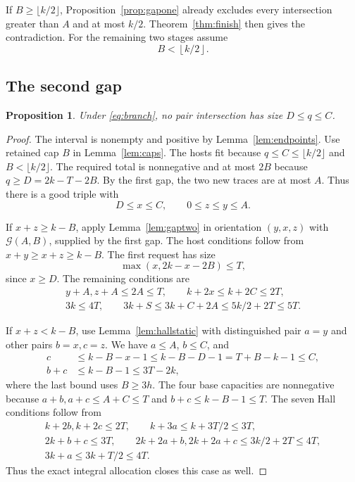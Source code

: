 \documentclass[11pt]{article}
\numberwithin{equation}{section}
\newtheorem{proposition}[theorem]{Proposition}
\theoremstyle{definition}
\theoremstyle{remark}
\newcommand{\floor}[1]{\left\lfloor #1\right\rfloor}
\begin{document}
If $B\ge\lfloor k/2\rfloor$, Proposition~\ref{prop:gapone} already
excludes every intersection greater than $A$ and at most $k/2$.
Theorem~\ref{thm:finish} then gives the contradiction.
For the remaining two stages assume
\begin{equation}\label{eq:branch}
 B<\floor{k/2}.
\end{equation}

\subsection{The second gap}
\begin{proposition}\label{prop:gaptwo}
Under \eqref{eq:branch}, no pair intersection has size $D\le q\le C$.
\end{proposition}
\begin{proof}
The interval is nonempty and positive by Lemma~\ref{lem:endpoints}.
Use retained cap $B$ in Lemma~\ref{lem:caps}.
The hosts fit because $q\le C\le\lfloor k/2\rfloor$ and
$B<\lfloor k/2\rfloor$. The required total is nonnegative and at most
$2B$ because $q\ge D=2k-T-2B$.
By the first gap, the two new traces are at most $A$.
Thus there is a good triple with
\[
 D\le x\le C,\qquad0\le z\le y\le A.
\]

If $x+z\ge k-B$, apply Lemma~\ref{lem:gaptwo} in orientation $(y,x,z)$
with $\mathcal G(A,B)$, supplied by the first gap.
The host conditions follow from $x+y\ge x+z\ge k-B$.
The first request has size
\[
 \max(x,2k-x-2B)\le T,
\]
since $x\ge D$. The remaining conditions are
\begin{gather*}
 y+A, z+A\le2A\le T,\qquad k+2x\le k+2C\le2T,\\
 3k\le4T,\qquad3k+S\le3k+C+2A\le5k/2+2T\le5T.
\end{gather*}

If $x+z<k-B$, use Lemma~\ref{lem:hallstatic} with distinguished pair
$a=y$ and other pairs $b=x,c=z$. We have $a\le A$, $b\le C$, and
\begin{align*}
 c&\le k-B-x-1\le k-B-D-1=T+B-k-1\le C,\\
 b+c&\le k-B-1\le3T-2k,
\end{align*}
where the last bound uses $B\ge3h$.
The four base capacities are nonnegative because
$a+b,a+c\le A+C\le T$ and $b+c\le k-B-1\le T$.
The seven Hall conditions follow from
\begin{gather*}
 k+2b, k+2c\le2T,\qquad k+3a\le k+3T/2\le3T,\\
 2k+b+c\le3T,\qquad
 2k+2a+b, 2k+2a+c\le3k/2+2T\le4T,\\
 3k+a\le3k+T/2\le4T.
\end{gather*}
Thus the exact integral allocation closes this case as well.
\end{proof}
\end{document}
